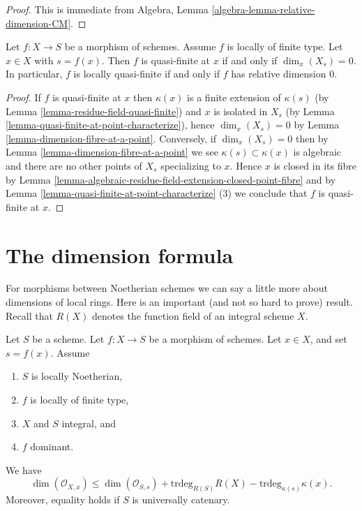 \begin{proof}
This is immediate from
Algebra,
Lemma
\ref{algebra-lemma-relative-dimension-CM}.
\end{proof}

\begin{lemma}
\label{lemma-locally-quasi-finite-rel-dimension-0}
Let $f : X \to S$ be a morphism of schemes.
Assume $f$ is locally of finite type.
Let $x \in X$ with $s = f(x)$.
Then $f$ is quasi-finite at $x$ if and only if $\dim_x(X_s) = 0$.
In particular, $f$ is locally quasi-finite if and only if $f$ has relative
dimension $0$.
\end{lemma}

\begin{proof}
If $f$ is quasi-finite at $x$ then $\kappa(x)$ is a finite extension of
$\kappa(s)$ (by
Lemma \ref{lemma-residue-field-quasi-finite})
and $x$ is isolated in $X_s$ (by
Lemma \ref{lemma-quasi-finite-at-point-characterize}),
hence $\dim_x(X_s) = 0$ by
Lemma \ref{lemma-dimension-fibre-at-a-point}.
Conversely, if $\dim_x(X_s) = 0$ then by
Lemma \ref{lemma-dimension-fibre-at-a-point}
we see $\kappa(s) \subset \kappa(x)$ is algebraic and
there are no other points of $X_s$ specializing to $x$.
Hence $x$ is closed in its fibre by
Lemma \ref{lemma-algebraic-residue-field-extension-closed-point-fibre}
and by
Lemma \ref{lemma-quasi-finite-at-point-characterize} (3)
we conclude that $f$ is quasi-finite at $x$.
\end{proof}





\section{The dimension formula}
\label{section-dimension-formula}

\noindent
For morphisms between Noetherian schemes we can say a little more
about dimensions of local rings. Here is an important (and not so
hard to prove) result. Recall that $R(X)$ denotes the function field
of an integral scheme $X$.

\begin{lemma}
\label{lemma-dimension-formula}
Let $S$ be a scheme.
Let $f : X \to S$ be a morphism of schemes.
Let $x \in X$, and set $s = f(x)$.
Assume
\begin{enumerate}
\item $S$ is locally Noetherian,
\item $f$ is locally of finite type,
\item $X$ and $S$ integral, and
\item $f$ dominant.
\end{enumerate}
We have
\begin{equation}
\label{equation-dimension-formula}
\dim(\mathcal{O}_{X, x})
\leq
\dim(\mathcal{O}_{S, s}) + \text{trdeg}_{R(S)}R(X)
- \text{trdeg}_{\kappa(s)} \kappa(x).
\end{equation}
Moreover, equality holds if $S$ is universally catenary.
\end{lemma}

